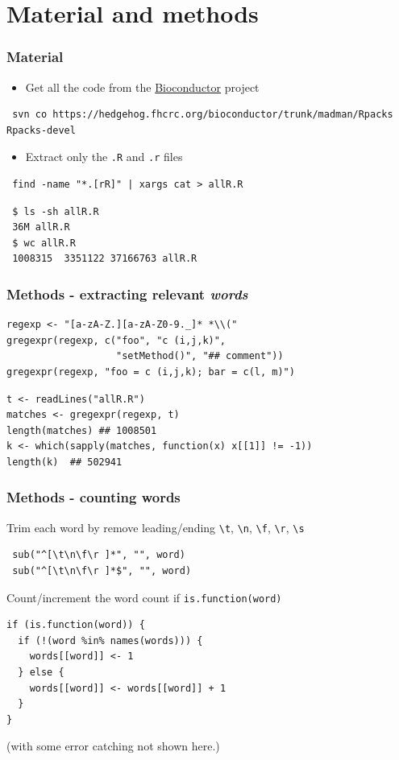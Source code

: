 \documentclass{beamer}
\begin{document}
\section{Material and methods}
\label{sec-2}
\begin{frame}[fragile]
\frametitle{Material}
\label{sec-2-1}


\begin{itemize}
\item Get all the code from the \url{Bioconductor} project
\end{itemize}
\begin{verbatim}
 svn co https://hedgehog.fhcrc.org/bioconductor/trunk/madman/Rpacks Rpacks-devel
\end{verbatim}
\begin{itemize}
\item Extract only the \texttt{.R} and \texttt{.r} files
\end{itemize}
\begin{verbatim}
 find -name "*.[rR]" | xargs cat > allR.R
\end{verbatim}

\begin{verbatim}
 $ ls -sh allR.R 
 36M allR.R
 $ wc allR.R 
 1008315  3351122 37166763 allR.R
\end{verbatim}
\end{frame}
\begin{frame}[fragile]
\frametitle{Methods - extracting relevant \emph{words}}
\label{sec-2-2}



\begin{verbatim}
regexp <- "[a-zA-Z.][a-zA-Z0-9._]* *\\("
gregexpr(regexp, c("foo", "c (i,j,k)",
                   "setMethod()", "## comment"))
gregexpr(regexp, "foo = c (i,j,k); bar = c(l, m)")
\end{verbatim}


\begin{verbatim}
t <- readLines("allR.R")
matches <- gregexpr(regexp, t)
length(matches) ## 1008501
k <- which(sapply(matches, function(x) x[[1]] != -1))
length(k)  ## 502941
\end{verbatim}
\end{frame}
\begin{frame}[fragile]
\frametitle{Methods - counting words}
\label{sec-2-3}


Trim each word by remove leading/ending \texttt{\textbackslash{}t}, \texttt{\textbackslash{}n}, \texttt{\textbackslash{}f}, \texttt{\textbackslash{}r}, \texttt{\textbackslash{}s}
\begin{verbatim}
 sub("^[\t\n\f\r ]*", "", word)
 sub("^[\t\n\f\r ]*$", "", word)
\end{verbatim}

Count/increment the word count if \texttt{is.function(word)}

\begin{verbatim}
if (is.function(word)) {           
  if (!(word %in% names(words))) {
    words[[word]] <- 1
  } else {
    words[[word]] <- words[[word]] + 1
  }
}
\end{verbatim}

(with some error catching not shown here.)
\end{frame}
\end{document}
